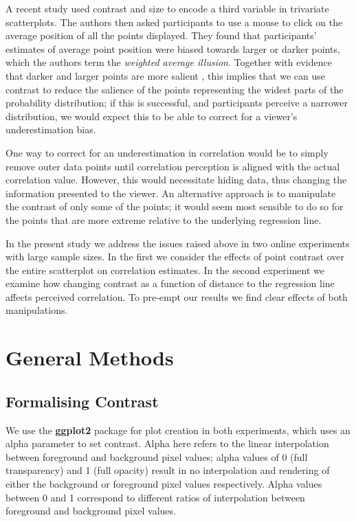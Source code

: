 \documentclass[preprint, 3p,
authoryear]{elsarticle} %
\begin{document}
A recent study \citep{hong_2021} used contrast and size to encode a
third variable in trivariate scatterplots. The authors then asked
participants to use a mouse to click on the average position of all the
points displayed. They found that participants' estimates of average
point position were biased towards larger or darker points, which the
authors term the \emph{weighted average illusion}. Together with
evidence that darker and larger points are more salient
\citep{healey_2012}, this implies that we can use contrast to reduce the
salience of the points representing the widest parts of the probability
distribution; if this is successful, and participants perceive a
narrower distribution, we would expect this to be able to correct for a
viewer's underestimation bias.

One way to correct for an underestimation in correlation would be to
simply remove outer data points until correlation perception is aligned
with the actual correlation value. However, this would necessitate
hiding data, thus changing the information presented to the viewer. An
alternative approach is to manipulate the contrast of only some of the
points; it would seem most sensible to do so for the points that are
more extreme relative to the underlying regression line.

In the present study we address the issues raised above in two online
experiments with large sample sizes. In the first we consider the
effects of point contrast over the entire scatterplot on correlation
estimates. In the second experiment we examine how changing contrast as
a function of distance to the regression line affects perceived
correlation. To pre-empt our results we find clear effects of both
manipulations.

\hypertarget{general-methods}{%
\section{General Methods}\label{general-methods}}

\hypertarget{formalising-contrast}{%
\subsection{Formalising Contrast}\label{formalising-contrast}}

We use the \textbf{ggplot2} \citep{hadley_gg2016} package for plot
creation in both experiments, which uses an alpha parameter to set
contrast. Alpha here refers to the linear interpolation
\citep{stone_2008} between foreground and background pixel values; alpha
values of 0 (full transparency) and 1 (full opacity) result in no
interpolation and rendering of either the background or foreground pixel
values respectively. Alpha values between 0 and 1 correspond to
different ratios of interpolation between foreground and background
pixel values.
\end{document}
